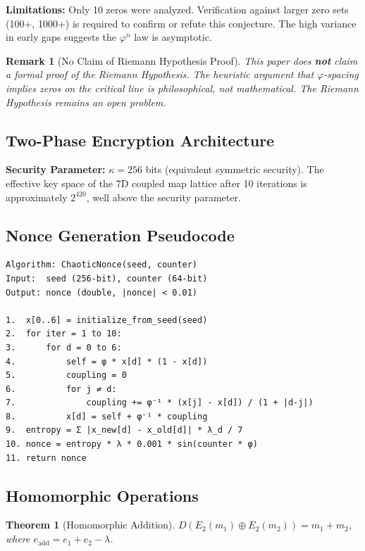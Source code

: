 \documentclass{article}
\newtheorem{theorem}{Theorem}[section]
\newtheorem{remark}{Remark}[section]
\begin{document}
\textbf{Limitations:} Only 10 zeros were analyzed. Verification against larger zero sets (100+, 1000+) is required to confirm or refute this conjecture. The high variance in early gaps suggests the $\varphi^n$ law is asymptotic.

\begin{remark}[No Claim of Riemann Hypothesis Proof]
This paper does \textbf{not} claim a formal proof of the Riemann Hypothesis. The heuristic argument that $\varphi$-spacing implies zeros on the critical line is philosophical, not mathematical. The Riemann Hypothesis remains an open problem.
\end{remark}

\subsection{Two-Phase Encryption Architecture}

\textbf{Security Parameter:} $\kappa = 256$ bits (equivalent symmetric security). The effective key space of the 7D coupled map lattice after 10 iterations is approximately $2^{420}$, well above the security parameter.

\subsection{Nonce Generation Pseudocode}

\begin{verbatim}
Algorithm: ChaoticNonce(seed, counter)
Input:  seed (256-bit), counter (64-bit)
Output: nonce (double, |nonce| < 0.01)

1.  x[0..6] = initialize_from_seed(seed)
2.  for iter = 1 to 10:
3.      for d = 0 to 6:
4.          self = φ * x[d] * (1 - x[d])
5.          coupling = 0
6.          for j ≠ d:
7.              coupling += φ⁻¹ * (x[j] - x[d]) / (1 + |d-j|)
8.          x[d] = self + φ⁻¹ * coupling
9.  entropy = Σ |x_new[d] - x_old[d]| * λ_d / 7
10. nonce = entropy * λ * 0.001 * sin(counter * φ)
11. return nonce
\end{verbatim}

\subsection{Homomorphic Operations}

\begin{theorem}[Homomorphic Addition]
$D(E_2(m_1) \oplus E_2(m_2)) = m_1 + m_2$, where $e_{\text{add}} = e_1 + e_2 - \lambda$.
\end{theorem}
\end{document}
